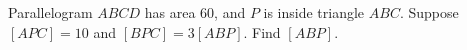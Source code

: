 Parallelogram $ABCD$ has area $60$, and $P$ is inside triangle $ABC$. Suppose $[APC]=10$ and $[BPC]=3[ABP]$. Find $[ABP]$.
